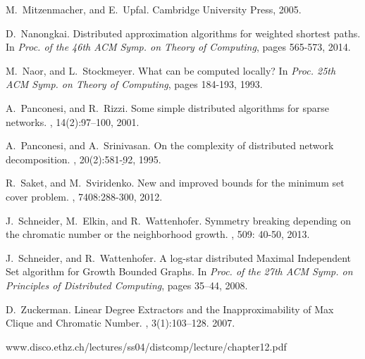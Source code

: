 \documentclass[11pt]{article}
\begin{document}
\begin{thebibliography}{10}
M.~Mitzenmacher, and E.~Upfal.
\newblock Cambridge University Press, 2005.

D.~Nanongkai.
\newblock Distributed approximation algorithms for weighted shortest paths.
\newblock In {\em Proc. of the 46th ACM Symp. on Theory of Computing}, pages 565-573, 2014.



M.~Naor, and L.~Stockmeyer.
\newblock What can be computed locally?
\newblock In {\em Proc. 25th ACM Symp. on Theory of Computing}, pages 184-193, 1993.



A.~Panconesi, and R.~Rizzi.
\newblock Some simple distributed algorithms for sparse networks.
, 14(2):97--100, 2001.

A.~Panconesi, and A.~Srinivasan.
\newblock On the complexity of distributed network decomposition.
, 20(2):581-ֵ92, 1995.







R.~Saket, and M.~Sviridenko.
\newblock New and improved bounds for the minimum set cover problem.
,  7408:288-300, 2012.

J.~Schneider, M.~Elkin, and R.~Wattenhofer.
\newblock Symmetry breaking depending on the chromatic number or the neighborhood growth.
, 509: 40-50, 2013.


J.~Schneider, and R.~Wattenhofer.
\newblock A log-star distributed Maximal Independent Set algorithm for Growth Bounded Graphs.
\newblock In {\em Proc. of the 27th ACM Symp. on Principles of Distributed Computing}, pages 35--44, 2008.



D.~Zuckerman.
\newblock Linear Degree Extractors and the Inapproximability of Max Clique and Chromatic Number.
, 3(1):103--128. 2007.

www.disco.ethz.ch/lectures/ss04/distcomp/lecture/chapter12.pdf


\end{thebibliography}
\end{document}
